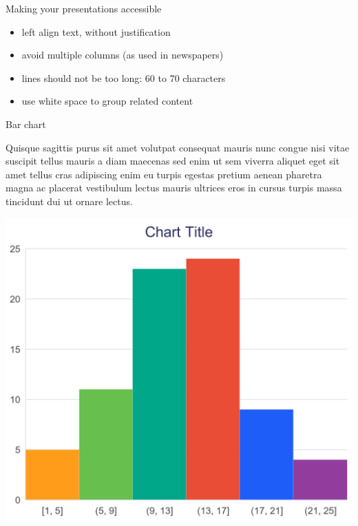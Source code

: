 \documentclass{beamer}
\begin{document}
  \begin{frame}[t]{Making your presentations accessible}
    \begin{itemize}
      \item left align text, without justification
      \item avoid multiple columns (as used in newspapers)
      \item lines should not be too long: 60 to 70 characters
      \item use white space to group related content
    \end{itemize}
  \end{frame}

  \begin{frame}{Bar chart}
      \begin{minipage}[l]{0.47\textwidth}
        \raggedright
        Quisque sagittis purus sit amet volutpat consequat mauris nunc congue nisi vitae suscipit tellus mauris a diam maecenas sed enim ut sem viverra aliquet eget sit amet tellus cras adipiscing enim eu turpis egestas pretium aenean pharetra magna ac placerat vestibulum lectus mauris ultrices eros in cursus turpis massa tincidunt dui ut ornare lectus.
      \end{minipage}
      \hfill
      \begin{minipage}{0.5\textwidth}
        \centering
        \includegraphics[width=\textwidth]{bar_chart}
      \end{minipage}
  \end{frame}
\end{document}
